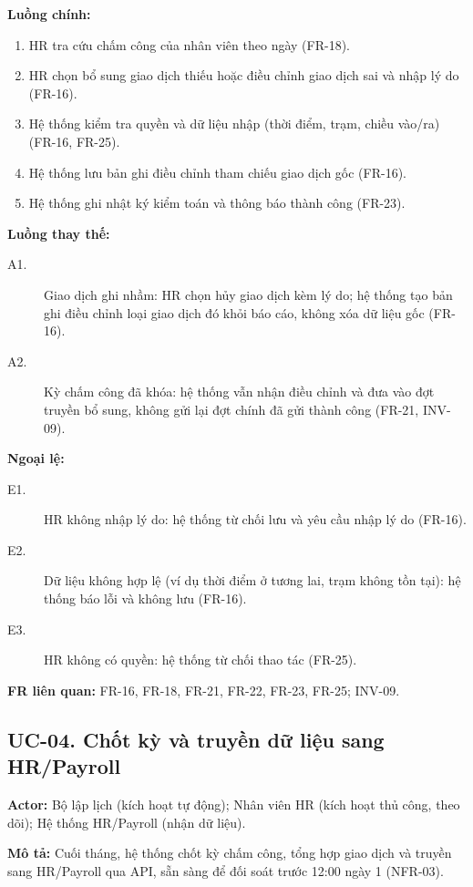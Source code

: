 \noindent\textbf{Luồng chính:}
\begin{enumerate}
    \item HR tra cứu chấm công của nhân viên theo ngày (FR-18).
    \item HR chọn bổ sung giao dịch thiếu hoặc điều chỉnh giao dịch sai và nhập lý do (FR-16).
    \item Hệ thống kiểm tra quyền và dữ liệu nhập (thời điểm, trạm, chiều vào/ra) (FR-16, FR-25).
    \item Hệ thống lưu bản ghi điều chỉnh tham chiếu giao dịch gốc (FR-16).
    \item Hệ thống ghi nhật ký kiểm toán và thông báo thành công (FR-23).
\end{enumerate}

\noindent\textbf{Luồng thay thế:}
\begin{description}
    \item[A1.] Giao dịch ghi nhầm: HR chọn hủy giao dịch kèm lý do; hệ thống tạo bản ghi điều chỉnh loại giao dịch đó khỏi báo cáo, không xóa dữ liệu gốc (FR-16).
    \item[A2.] Kỳ chấm công đã khóa: hệ thống vẫn nhận điều chỉnh và đưa vào đợt truyền bổ sung, không gửi lại đợt chính đã gửi thành công (FR-21, INV-09).
\end{description}

\noindent\textbf{Ngoại lệ:}
\begin{description}
    \item[E1.] HR không nhập lý do: hệ thống từ chối lưu và yêu cầu nhập lý do (FR-16).
    \item[E2.] Dữ liệu không hợp lệ (ví dụ thời điểm ở tương lai, trạm không tồn tại): hệ thống báo lỗi và không lưu (FR-16).
    \item[E3.] HR không có quyền: hệ thống từ chối thao tác (FR-25).
\end{description}

\noindent\textbf{FR liên quan:} FR-16, FR-18, FR-21, FR-22, FR-23, FR-25; INV-09.

\subsection{UC-04. Chốt kỳ và truyền dữ liệu sang HR/Payroll}

\noindent\textbf{Actor:} Bộ lập lịch (kích hoạt tự động); Nhân viên HR (kích hoạt thủ công, theo dõi); Hệ thống HR/Payroll (nhận dữ liệu).

\noindent\textbf{Mô tả:} Cuối tháng, hệ thống chốt kỳ chấm công, tổng hợp giao dịch và truyền sang HR/Payroll qua API, sẵn sàng để đối soát trước 12:00 ngày 1 (NFR-03).

